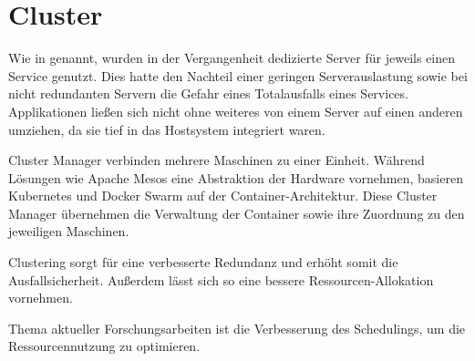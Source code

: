 \section{Cluster}
\label{sec:Cluster}
Wie in  genannt, wurden in der Vergangenheit dedizierte Server für jeweils einen Service genutzt.
Dies hatte den Nachteil einer geringen Serverauslastung sowie bei nicht redundanten Servern die Gefahr eines Totalausfalls eines Services.
Applikationen ließen sich nicht ohne weiteres von einem Server auf einen anderen umziehen, da sie tief in das Hostsystem integriert waren.

Cluster Manager verbinden mehrere Maschinen zu einer Einheit. Während Lösungen wie Apache Mesos eine Abstraktion der Hardware vornehmen, basieren Kubernetes und Docker Swarm auf der Container-Architektur.
Diese Cluster Manager übernehmen die Verwaltung der Container sowie ihre Zuordnung zu den jeweiligen Maschinen.

Clustering sorgt für eine verbesserte Redundanz und erhöht somit die Ausfallsicherheit.
Außerdem lässt sich so eine bessere Ressourcen-Allokation vornehmen.

Thema aktueller Forschungsarbeiten ist die Verbesserung des Schedulings, um die Ressourcennutzung zu optimieren.\cite{Liu2018}

